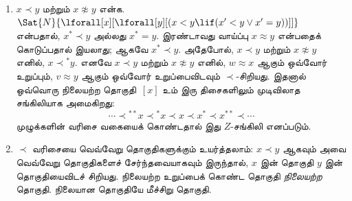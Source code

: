 \documentclass[../../../include/open-logic-section]{subfiles}
\begin{document}
\begin{enumerate}
\item $x \prec y$ மற்றும் $x \not\approx y$
  என்க. $\Sat{N}{\lforall[x][\lforall[y][(x < y \lif (x' < y \lor x' =
      y))]]}$ என்பதால், $x^* \prec y$ அல்லது
  $x^* = y$. இரண்டாவது வாய்ப்பு
  $x \approx y$ என்பதைக் கொடுப்பதால் இயலாது;
  ஆகவே $x^* \prec y$. அதேபோல்,
  $x \prec y$ மற்றும் $x \not\approx y$
  எனில், $x \prec {^*y}$. எனவே
  $x \prec y$ மற்றும் $x \not\approx y$
  எனில், $w \approx x$ ஆகும் ஒவ்வோர்
  உறுப்பும், $v \approx y$ ஆகும் ஒவ்வோர்
  உறுப்பைவிடவும் $\prec$-சிறியது.
  இதனால் ஒவ்வொரு நிலையற்ற தொகுதி~$[x]$ உம்
  இரு திசைகளிலும் முடிவிலாத சங்கிலியாக அமைகிறது:
  \[
  \cdots \prec  {^{**}x} \prec {^*}x \prec x \prec x^* \prec x^{**}
  \prec \cdots
  \]
  முழுக்களின் வரிசை வகையைக் கொண்டதால் இது
  $Z$-சங்கிலி எனப்படும்.

\item $\prec$ வரிசையை வெவ்வேறு தொகுதிகளுக்கும்
  உயர்த்தலாம்: $x \prec y$ ஆகவும் அவை
  வெவ்வேறு தொகுதிகளைச் சேர்ந்தவையாகவும் இருந்தால்,
  $x$ இன் தொகுதி $y$ இன் தொகுதியைவிடச் சிறியது.
  நிலையற்ற உறுப்பைக் கொண்ட தொகுதி
  \emph{நிலையற்ற} தொகுதி. நிலையான தொகுதியே
  மீச்சிறு தொகுதி.


\end{enumerate}
\end{document}
